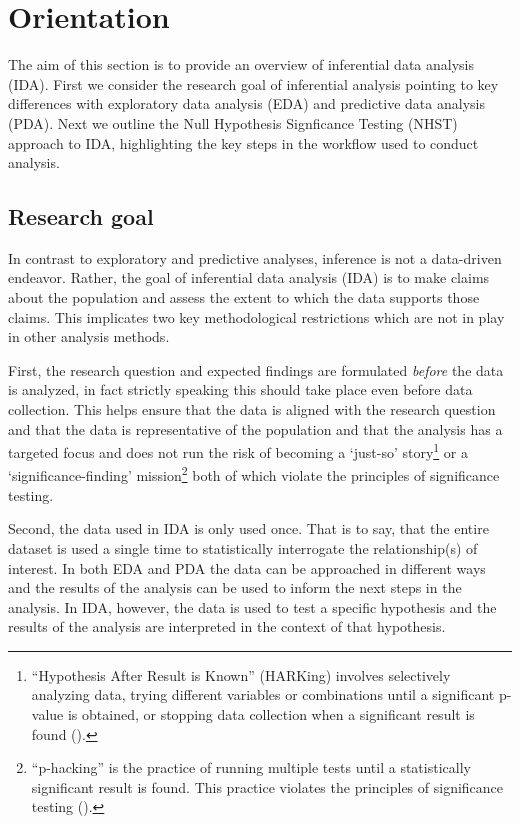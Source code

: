 \documentclass[
  letterpaper,
  DIV=11,
  numbers=noendperiod]{scrreprt}
\theoremstyle{definition}
\theoremstyle{remark}
\begin{document}
\section{Orientation}\label{sec-ida-orientation}

The aim of this section is to provide an overview of inferential data
analysis (IDA). First we consider the research goal of inferential
analysis pointing to key differences with exploratory data analysis
(EDA) and predictive data analysis (PDA). Next we outline the Null
Hypothesis Signficance Testing (NHST) approach to IDA, highlighting the
key steps in the workflow used to conduct analysis.

\subsection{Research goal}\label{sec-ida-research-goal}

In contrast to exploratory and predictive analyses, inference is not a
data-driven endeavor. Rather, the goal of inferential data analysis
(IDA) is to make claims about the population and assess the extent to
which the data supports those claims. This implicates two key
methodological restrictions which are not in play in other analysis
methods.

First, the research question and expected findings are formulated
\emph{before} the data is analyzed, in fact strictly speaking this
should take place even before data collection. This helps ensure that
the data is aligned with the research question and that the data is
representative of the population and that the analysis has a targeted
focus and does not run the risk of becoming a `just-so' story\footnote{``Hypothesis
  After Result is Known'' (HARKing) involves selectively analyzing data,
  trying different variables or combinations until a significant p-value
  is obtained, or stopping data collection when a significant result is
  found ().} or a
`significance-finding' mission\footnote{``p-hacking'' is the practice of
  running multiple tests until a statistically significant result is
  found. This practice violates the principles of significance testing
  ().} both of which violate
the principles of significance testing.

Second, the data used in IDA is only used once. That is to say, that the
entire dataset is used a single time to statistically interrogate the
relationship(s) of interest. In both EDA and PDA the data can be
approached in different ways and the results of the analysis can be used
to inform the next steps in the analysis. In IDA, however, the data is
used to test a specific hypothesis and the results of the analysis are
interpreted in the context of that hypothesis.
\end{document}
